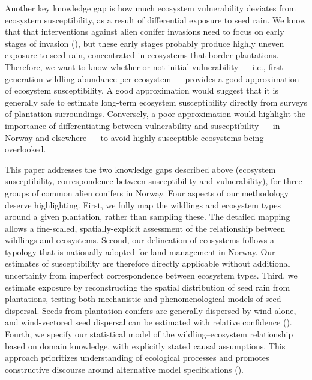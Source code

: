 \documentclass[
]{article}
\begin{document}
Another key knowledge gap is how much ecosystem vulnerability deviates from
ecosystem susceptibility, as a result of differential exposure to seed rain. We
know that that interventions against alien conifer invasions need to focus on
early stages of invasion (), but these early
stages probably produce highly uneven exposure to seed rain, concentrated in
ecosystems that border plantations. Therefore, we want to know whether or not
initial vulnerability --- i.e., first-generation wildling abundance per
ecosystem --- provides a good approximation of ecosystem susceptibility. A good
approximation would suggest that it is generally safe to estimate long-term
ecosystem susceptibility directly from surveys of plantation surroundings.
Conversely, a poor approximation would highlight the importance of
differentiating between vulnerability and susceptibility --- in Norway and
elsewhere --- to avoid highly susceptible ecosystems being overlooked.

This paper addresses the two knowledge gaps described above (ecosystem
susceptibility, correspondence between susceptibility and vulnerability), for
three groups of common alien conifers in Norway. Four aspects of our methodology
deserve highlighting. First, we fully map the wildlings and ecosystem types
around a given plantation, rather than sampling these. The detailed mapping
allows a fine-scaled, spatially-explicit assessment of the relationship between
wildlings and ecosystems. Second, our delineation of ecosystems follows a
typology that is nationally-adopted for land management in Norway. Our estimates
of susceptibility are therefore directly applicable without additional
uncertainty from imperfect correspondence between ecosystem types. Third, we
estimate exposure by reconstructing the spatial distribution of seed rain from
plantations, testing both mechanistic and phenomenological models of seed
dispersal. Seeds from plantation conifers are generally dispersed by wind alone,
and wind-vectored seed dispersal can be estimated with relative confidence
(). Fourth, we specify our statistical model of the
wildling--ecosystem relationship based on domain knowledge, with explicitly
stated causal assumptions. This approach prioritizes understanding of ecological
processes and promotes constructive discourse around alternative model
specifications ().
\end{document}
